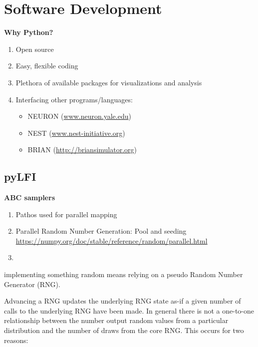 \section{Software Development}

\textbf{Why Python?}

\begin{enumerate}
    \item Open source
    \item Easy, flexible coding
    \item Plethora of available packages for visualizations and analysis
    \item Interfacing other programs/languages:
    \begin{itemize}
        \item NEURON (\url{www.neuron.yale.edu})
        \item NEST (\url{www.nest-initiative.org})
        \item BRIAN (\url{http://briansimulator.org})
    \end{itemize}
\end{enumerate}


\subsection{pyLFI}

\textbf{ABC samplers} 

\begin{enumerate}
    \item Pathos used for parallel mapping
    \item Parallel Random Number Generation: Pool and seeding \url{https://numpy.org/doc/stable/reference/random/parallel.html} 
    \item 
\end{enumerate}

implementing something random means relying on a pseudo Random Number Generator (RNG).

Advancing a RNG updates the underlying RNG state as-if a given number of calls to the underlying RNG have been made. In general there is not a one-to-one relationship between the number output random values from a particular distribution and the number of draws from the core RNG. This occurs for two reasons:

